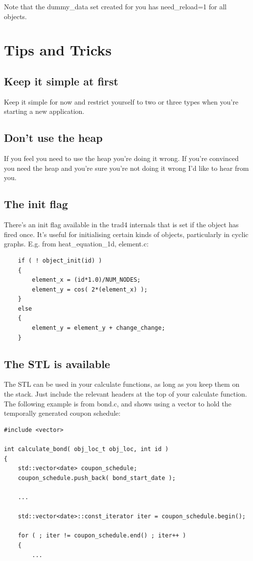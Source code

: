 \documentclass{report}
\begin{document}
Note that the dummy_data set created for you has need_reload=1 for all objects.

\section{Tips and Tricks}

\subsection{Keep it simple at first}

Keep it simple for now and restrict yourself to two or three types when you're starting a new application.

\subsection{Don't use the heap}

If you feel you need to use the heap you're doing it wrong. If you're convinced you need the heap and you're sure you're not doing it wrong I'd like to hear from you.

\subsection{The init flag}

There's an init flag available in the trad4 internals that is set if the object has fired once. It's useful for initialising certain kinds of objects, particularly in cyclic graphs. E.g. from heat_equation_1d, element.c:

\begin{verbatim}
    if ( ! object_init(id) )
    {
        element_x = (id*1.0)/NUM_NODES;
        element_y = cos( 2*(element_x) );
    }
    else
    {
        element_y = element_y + change_change;
    }
\end{verbatim}

\subsection{The STL is available}

The STL  can be used in your calculate functions, as long as you keep them on the stack. Just include the relevant headers at the top of your calculate function. The following example is from bond.c, and shows using a vector to hold the temporally generated coupon schedule:

\begin{verbatim}
#include <vector>

int calculate_bond( obj_loc_t obj_loc, int id )
{
    std::vector<date> coupon_schedule;
    coupon_schedule.push_back( bond_start_date );

    ...

    std::vector<date>::const_iterator iter = coupon_schedule.begin();

    for ( ; iter != coupon_schedule.end() ; iter++ )
    {
        ...
\end{verbatim}
\end{document}
